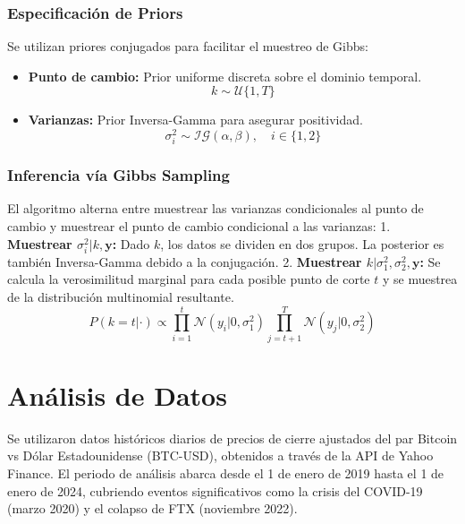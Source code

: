 \documentclass[
]{ceurart}
\begin{document}
\subsubsection{Especificación de Priors}
Se utilizan priores conjugados para facilitar el muestreo de Gibbs:
\begin{itemize}
    \item \textbf{Punto de cambio:} Prior uniforme discreta sobre el dominio temporal.
    \begin{equation}
    k \sim \mathcal{U}\{1, T\}
    \end{equation}
    \item \textbf{Varianzas:} Prior Inversa-Gamma para asegurar positividad.
    \begin{equation}
    \sigma_i^2 \sim \mathcal{IG}(\alpha, \beta), \quad i \in \{1, 2\}
    \end{equation}
\end{itemize}

\subsubsection{Inferencia vía Gibbs Sampling}
El algoritmo alterna entre muestrear las varianzas condicionales al punto de cambio y muestrear el punto de cambio condicional a las varianzas:
1. \textbf{Muestrear $\sigma_i^2 | k, \mathbf{y}$:} Dado $k$, los datos se dividen en dos grupos. La posterior es también Inversa-Gamma debido a la conjugación.
2. \textbf{Muestrear $k | \sigma_1^2, \sigma_2^2, \mathbf{y}$:} Se calcula la verosimilitud marginal para cada posible punto de corte $t$ y se muestrea de la distribución multinomial resultante.
\begin{equation}
P(k=t | \cdot) \propto \prod_{i=1}^t \mathcal{N}(y_i | 0, \sigma_1^2) \prod_{j=t+1}^T \mathcal{N}(y_j | 0, \sigma_2^2)
\end{equation}

\section{Análisis de Datos}

Se utilizaron datos históricos diarios de precios de cierre ajustados del par Bitcoin vs Dólar Estadounidense (BTC-USD), obtenidos a través de la API de Yahoo Finance. El periodo de análisis abarca desde el 1 de enero de 2019 hasta el 1 de enero de 2024, cubriendo eventos significativos como la crisis del COVID-19 (marzo 2020) y el colapso de FTX (noviembre 2022).
\end{document}
